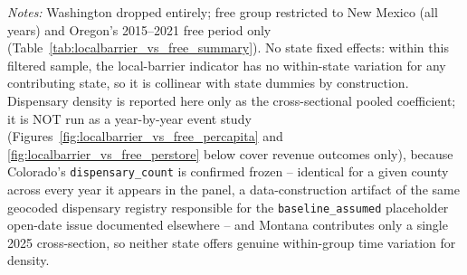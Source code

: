 \begin{table}[htbp]
\centering
\caption{Local barrier vs. free entry: pooled border $\times$ regime interaction (Washington dropped)}
\label{tab:localbarrier_vs_free_pooled}
\footnotesize
{}
\begin{minipage}{0.98\textwidth}
\vspace{0.3em}
\footnotesize
\textit{Notes:} Washington dropped entirely; free group restricted to New Mexico (all years) and Oregon's
2015--2021 free period only (Table~\ref{tab:localbarrier_vs_free_summary}). No state fixed effects: within this
filtered sample, the local-barrier indicator has no within-state variation for any contributing state, so it is
collinear with state dummies by construction. Dispensary density is reported here only as the cross-sectional
pooled coefficient; it is NOT run as a year-by-year event study (Figures~\ref{fig:localbarrier_vs_free_percapita}
and \ref{fig:localbarrier_vs_free_perstore} below cover revenue outcomes only), because Colorado's
\texttt{dispensary\_count} is confirmed frozen -- identical for a given county across every year it appears in
the panel, a data-construction artifact of the same geocoded dispensary registry responsible for the
\texttt{baseline\_assumed} placeholder open-date issue documented elsewhere -- and Montana contributes only a
single 2025 cross-section, so neither state offers genuine within-group time variation for density.
\end{minipage}
\end{table}
